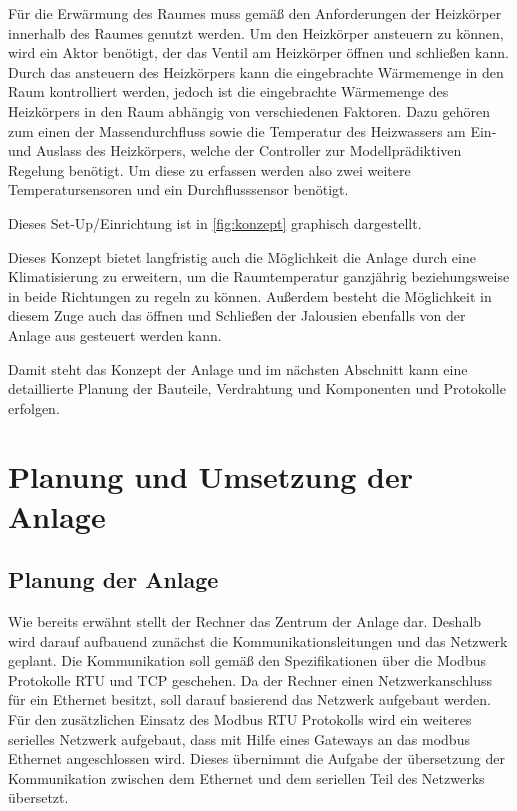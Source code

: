 Für die Erwärmung des Raumes muss gemäß den Anforderungen der Heizkörper innerhalb des Raumes genutzt werden. Um den Heizkörper ansteuern zu können, wird ein Aktor benötigt, der das Ventil am Heizkörper öffnen und schließen kann. 
Durch das ansteuern des Heizkörpers kann die eingebrachte Wärmemenge in den Raum kontrolliert werden, jedoch ist die eingebrachte Wärmemenge des Heizkörpers in den Raum abhängig von verschiedenen Faktoren. Dazu gehören zum einen der Massendurchfluss sowie die Temperatur des Heizwassers am Ein- und Auslass des Heizkörpers, welche der Controller zur Modellprädiktiven Regelung benötigt. Um diese zu erfassen werden also zwei weitere Temperatursensoren und ein Durchflusssensor benötigt.

Dieses Set-Up/Einrichtung ist in \ref{fig:konzept} graphisch dargestellt.

Dieses Konzept bietet langfristig auch die Möglichkeit die Anlage durch eine Klimatisierung zu erweitern, um die Raumtemperatur ganzjährig beziehungsweise in beide Richtungen zu regeln zu können. Außerdem besteht die Möglichkeit in diesem Zuge auch das öffnen und Schließen der Jalousien ebenfalls von der Anlage aus gesteuert werden kann.

Damit steht das Konzept der Anlage und im nächsten Abschnitt kann eine detaillierte Planung der Bauteile, Verdrahtung und Komponenten und Protokolle erfolgen.

\section{Planung und Umsetzung der Anlage}

\subsection{Planung der Anlage}

Wie bereits erwähnt stellt der Rechner das Zentrum der Anlage dar. Deshalb wird darauf aufbauend zunächst die Kommunikationsleitungen und das Netzwerk geplant. Die Kommunikation soll gemäß den Spezifikationen über die Modbus Protokolle RTU und TCP geschehen. Da der Rechner einen Netzwerkanschluss für ein Ethernet besitzt, soll darauf basierend das Netzwerk aufgebaut werden. Für den zusätzlichen Einsatz des Modbus RTU Protokolls wird ein weiteres serielles Netzwerk aufgebaut, dass mit Hilfe eines Gateways an das modbus Ethernet angeschlossen wird. Dieses übernimmt die Aufgabe der übersetzung der Kommunikation zwischen dem Ethernet und dem seriellen Teil des Netzwerks übersetzt.

